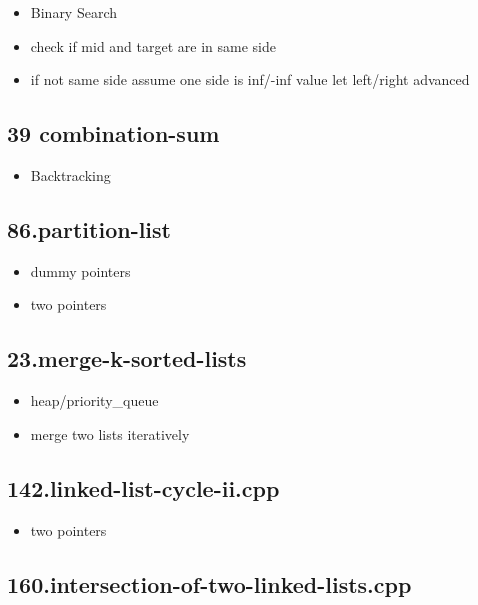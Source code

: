 \begin{itemize}
	\item Binary Search
	\item check if mid and target are in same side
	\item if not same side assume one side is inf/-inf value let left/right advanced
\end{itemize}

\subsection{39 combination-sum}

\begin{itemize}
	\item Backtracking
\end{itemize}

\subsection{86.partition-list}

\begin{itemize}
	\item dummy pointers
	\item two pointers
\end{itemize}

\subsection{23.merge-k-sorted-lists}

\begin{itemize}
	\item heap/priority\_queue
	\item merge two lists iteratively
\end{itemize}

\subsection{142.linked-list-cycle-ii.cpp}

\begin{itemize}
	\item two pointers
\end{itemize}

\subsection{160.intersection-of-two-linked-lists.cpp}

